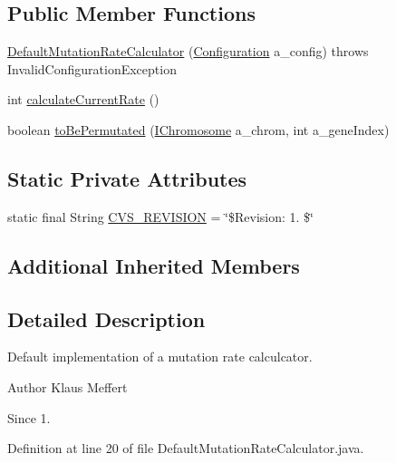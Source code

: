 \subsection*{Public Member Functions}
\begin{DoxyCompactItemize}
\item 
\hyperlink{classorg_1_1jgap_1_1impl_1_1_default_mutation_rate_calculator_a779b169879d3d685a80a135bd0645383}{Default\-Mutation\-Rate\-Calculator} (\hyperlink{classorg_1_1jgap_1_1_configuration}{Configuration} a\-\_\-config)  throws Invalid\-Configuration\-Exception 
\item 
int \hyperlink{classorg_1_1jgap_1_1impl_1_1_default_mutation_rate_calculator_a9c1e43e6ebe10badab0093e084f33172}{calculate\-Current\-Rate} ()
\item 
boolean \hyperlink{classorg_1_1jgap_1_1impl_1_1_default_mutation_rate_calculator_a795b836f85740742f5a88860915a3ff4}{to\-Be\-Permutated} (\hyperlink{interfaceorg_1_1jgap_1_1_i_chromosome}{I\-Chromosome} a\-\_\-chrom, int a\-\_\-gene\-Index)
\end{DoxyCompactItemize}
\subsection*{Static Private Attributes}
\begin{DoxyCompactItemize}
\item 
static final String \hyperlink{classorg_1_1jgap_1_1impl_1_1_default_mutation_rate_calculator_a451bf1123dd7668fd403793f6069cb56}{C\-V\-S\-\_\-\-R\-E\-V\-I\-S\-I\-O\-N} = \char`\"{}\$Revision\-: 1. \$\char`\"{}
\end{DoxyCompactItemize}
\subsection*{Additional Inherited Members}


\subsection{Detailed Description}
Default implementation of a mutation rate calculcator.

\begin{DoxyAuthor}{Author}
Klaus Meffert 
\end{DoxyAuthor}
\begin{DoxySince}{Since}
1. 
\end{DoxySince}


Definition at line 20 of file Default\-Mutation\-Rate\-Calculator.\-java.



